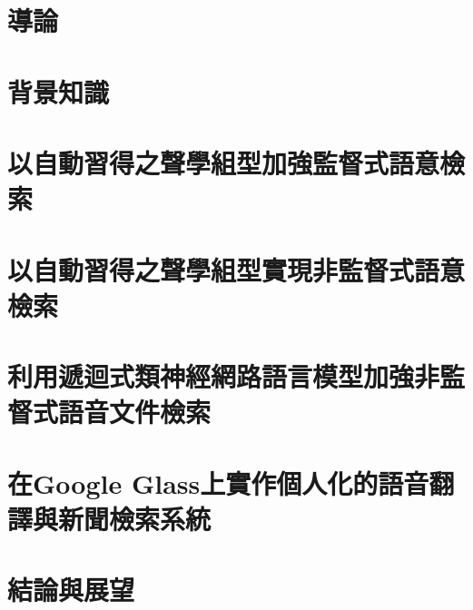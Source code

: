 \documentclass[12pt, a4paper]{ntuthesis}
\begin{document}

\indent  %








\chapter{導論}
  
\chapter{背景知識}
  
\chapter{以自動習得之聲學組型加強監督式語意檢索}
  
\chapter{以自動習得之聲學組型實現非監督式語意檢索}
  
\chapter{利用遞迴式類神經網路語言模型加強非監督式語音文件檢索}
  
\chapter{在Google Glass上實作個人化的語音翻譯與新聞檢索系統}
  
\chapter{結論與展望}
  


\end{document}
